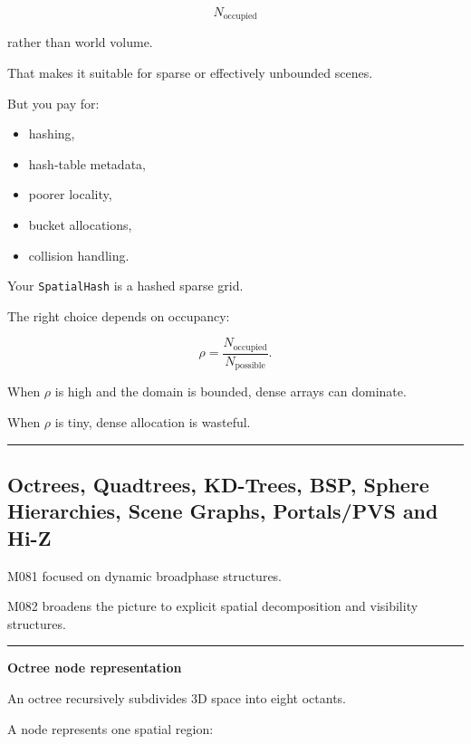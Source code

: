 \[
N_{\text{occupied}}
\]

rather than world volume.

That makes it suitable for sparse or effectively unbounded scenes.

But you pay for:

\begin{itemize}
\tightlist
\item
  hashing,
\item
  hash-table metadata,
\item
  poorer locality,
\item
  bucket allocations,
\item
  collision handling.
\end{itemize}

Your \texttt{SpatialHash} is a hashed sparse grid.

The right choice depends on occupancy:

\[
\rho=
\frac{N_{\text{occupied}}}
{N_{\text{possible}}}.
\]

When \(\rho\) is high and the domain is bounded, dense arrays can dominate.

When \(\rho\) is tiny, dense allocation is wasteful.

\begin{center}\rule{0.5\linewidth}{0.5pt}\end{center}

\subsection{Octrees, Quadtrees, KD-Trees, BSP, Sphere Hierarchies, Scene Graphs, Portals/PVS and Hi-Z}\label{06-engine-ii-ch029-octrees-quadtrees-kd-trees-bsp-sphere-hierarchies-scene-graphs-portalspvs-and-hi-z}

\hypertarget{06-engine-ii-ch029-octrees-quadtrees-kd-trees-bsp-sphere-hierarchies-scene-graphs-portalspvs-and-hi-z}{}

M081 focused on dynamic broadphase structures.

M082 broadens the picture to explicit spatial decomposition and visibility structures.

\begin{center}\rule{0.5\linewidth}{0.5pt}\end{center}

\textbf{Octree node representation}

An octree recursively subdivides 3D space into eight octants.

A node represents one spatial region:

